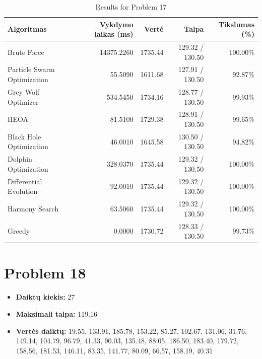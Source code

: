 \documentclass[a4paper,11pt]{article}
\begin{document}
\begin{table}[h!]
\centering
\begin{tabular}{lrrrr}
\toprule
\textbf{Algoritmas} & \textbf{Vykdymo laikas (ms)} & \textbf{Vertė} & \textbf{Talpa} & \textbf{Tikslumas (\%)} \\
\midrule
Brute Force & 14375.2260 & 1735.44 & 129.32 / 130.50 & 100.00\% \\
Particle Swarm Optimization & 55.5090 & 1611.68 & 127.91 / 130.50 & 92.87\% \\
Grey Wolf Optimizer & 534.5450 & 1734.16 & 128.77 / 130.50 & 99.93\% \\
HEOA & 81.5100 & 1729.38 & 128.91 / 130.50 & 99.65\% \\
Black Hole Optimization & 46.0010 & 1645.58 & 130.50 / 130.50 & 94.82\% \\
Dolphin Optimization & 328.0370 & 1735.44 & 129.32 / 130.50 & 100.00\% \\
Differential Evolution & 92.0010 & 1735.44 & 129.32 / 130.50 & 100.00\% \\
Harmony Search & 63.5060 & 1735.44 & 129.32 / 130.50 & 100.00\% \\
Greedy & 0.0000 & 1730.72 & 128.33 / 130.50 & 99.73\% \\
\bottomrule
\end{tabular}
\caption{Results for Problem 17}
\end{table}
\clearpage

\section*{Problem 18}
\begin{itemize}
    \item \textbf{Daiktų kiekis:} 27
    \item \textbf{Maksimali talpa:} 119.16
    \item \textbf{Vertės daiktų:} 19.55, 133.91, 185.78, 153.22, 85.27, 102.67, 131.06, 31.76, 149.14, 104.79, 96.79, 41.33, 90.03, 135.48, 88.05, 186.50, 183.40, 179.72, 158.56, 181.53, 146.11, 83.35, 141.77, 80.09, 66.57, 158.19, 40.31
\end{itemize}
\end{document}

